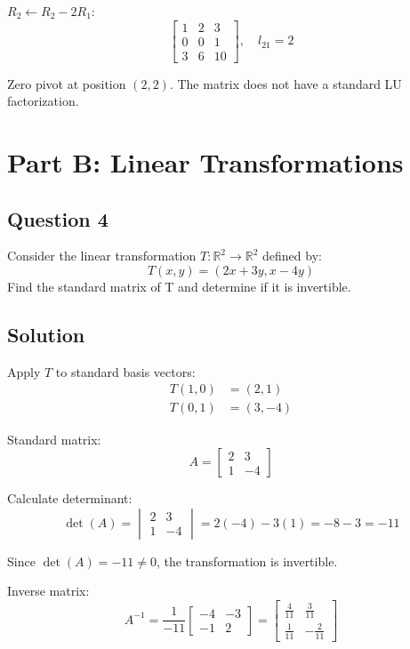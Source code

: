 \documentclass[12pt]{article}
\begin{document}
$R_2 \leftarrow R_2 - 2R_1$:
\[
	\begin{bmatrix}
		1 & 2 & 3 \\
		0 & 0 & 1 \\
		3 & 6 & 10
	\end{bmatrix}, \quad l_{21} = 2
\]

Zero pivot at position $(2,2)$. The matrix does not have a standard LU factorization.

\vspace{2em}
\section*{Part B: Linear Transformations}
\hrulefill
\vspace{1em}

\subsection*{Question 4}
Consider the linear transformation $T : \mathbb{R}^{2} \rightarrow \mathbb{R}^{2}$ defined by:
$$
T(x,y) = (2x + 3y, x - 4y)
$$
Find the standard matrix of T and determine if it is invertible.

\subsection*{Solution}

Apply $T$ to standard basis vectors:
\begin{align*}
	T(1,0) &= (2, 1) \\
	T(0,1) &= (3, -4)
\end{align*}

Standard matrix:
\[
	A = \begin{bmatrix}
		2 & 3 \\
		1 & -4
	\end{bmatrix}
\]

Calculate determinant:
\[
	\det(A) = \begin{vmatrix}
		2 & 3 \\
		1 & -4
	\end{vmatrix} = 2(-4) - 3(1) = -8 - 3 = -11
\]

Since $\det(A) = -11 \neq 0$, the transformation is invertible.

Inverse matrix:
\[
	A^{-1} = \frac{1}{-11}\begin{bmatrix}
		-4 & -3 \\
		-1 & 2
	\end{bmatrix} = \begin{bmatrix}
		\frac{4}{11} & \frac{3}{11} \\
		\frac{1}{11} & -\frac{2}{11}
	\end{bmatrix}
\]
\end{document}
